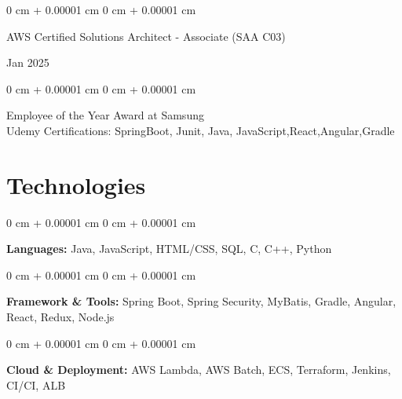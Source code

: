 \documentclass[10pt, a4paper]{article}
\newenvironment{onecolentry}{
    \begin{adjustwidth}{
        0 cm + 0.00001 cm
    }{
        0 cm + 0.00001 cm
    }
}{
    \end{adjustwidth}
} %
\newenvironment{twocolentry}[2][]{
    \onecolentry
    \def\secondColumn{#2}
    \setcolumnwidth{\fill, 4.5 cm}
    \begin{paracol}{2}
}{
    \switchcolumn \raggedleft \secondColumn
    \end{paracol}
    \endonecolentry
} %
\begin{document}
        \begin{samepage}
            \begin{twocolentry}{
                Jan 2025
            }
                {AWS Certified Solutions Architect - Associate (SAA C03)}
            \end{twocolentry}

    
            \begin{onecolentry}
               Employee of the Year Award at Samsung \\
               Udemy Certifications: SpringBoot, Junit, Java,  JavaScript,React,Angular,Gradle
            \end{onecolentry}
        \end{samepage}

    
    \section{Technologies}
    
        \begin{onecolentry}
            \textbf{Languages:} Java, JavaScript, HTML/CSS, SQL, C, C++, Python
        \end{onecolentry}
         \begin{onecolentry}
            \textbf{Framework \& Tools:} Spring Boot, Spring Security, MyBatis, Gradle, Angular, React, Redux, Node.js
        \end{onecolentry}
          \begin{onecolentry}
            \textbf{Cloud \& Deployment:} AWS Lambda, AWS Batch, ECS, Terraform, Jenkins, CI/CI, ALB
        \end{onecolentry}
        
\end{document}
